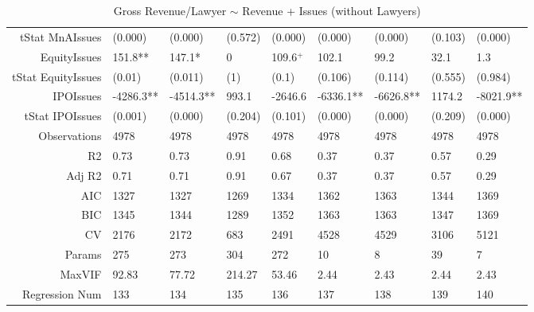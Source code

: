 \begin{table}[ht]
\begin{tabular}{rllllllll}
  tStat MnAIssues & (0.000) & (0.000) & (0.572) & (0.000) & (0.000) & (0.000) & (0.103) & (0.000) \\ 
  EquityIssues & 151.8** & 147.1* & 0 & 109.6$^{+}$ & 102.1 & 99.2 & 32.1 & 1.3 \\ 
  tStat EquityIssues & (0.01) & (0.011) & (1) & (0.1) & (0.106) & (0.114) & (0.555) & (0.984) \\ 
  IPOIssues & -4286.3** & -4514.3** & 993.1 & -2646.6 & -6336.1** & -6626.8** & 1174.2 & -8021.9** \\ 
  tStat IPOIssues & (0.001) & (0.000) & (0.204) & (0.101) & (0.000) & (0.000) & (0.209) & (0.000) \\ 
  Observations & 4978 & 4978 & 4978 & 4978 & 4978 & 4978 & 4978 & 4978 \\ 
  R2 & 0.73 & 0.73 & 0.91 & 0.68 & 0.37 & 0.37 & 0.57 & 0.29 \\ 
  Adj R2 & 0.71 & 0.71 & 0.91 & 0.67 & 0.37 & 0.37 & 0.57 & 0.29 \\ 
  AIC & 1327 & 1327 & 1269 & 1334 & 1362 & 1363 & 1344 & 1369 \\ 
  BIC & 1345 & 1344 & 1289 & 1352 & 1363 & 1363 & 1347 & 1369 \\ 
  CV & 2176 & 2172 & 683 & 2491 & 4528 & 4529 & 3106 & 5121 \\ 
  Params & 275 & 273 & 304 & 272 & 10 & 8 & 39 & 7 \\ 
  MaxVIF & 92.83 & 77.72 & 214.27 & 53.46 & 2.44 & 2.43 & 2.44 & 2.43 \\ 
  Regression Num & 133 & 134 & 135 & 136 & 137 & 138 & 139 & 140 \\ 
   \hline
\end{tabular}
\caption{Gross Revenue/Lawyer $\sim$ Revenue + Issues (without Lawyers)} 
\end{table}
